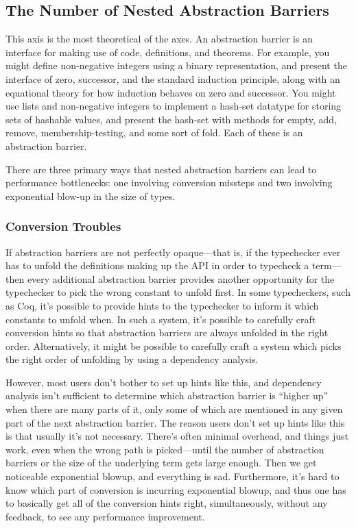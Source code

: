 
\subsection{The Number of Nested Abstraction Barriers}


This axis is the most theoretical of the axes.
An abstraction barrier is an interface for making use of code, definitions, and theorems.
For example, you might define non-negative integers using a binary representation, and present the interface of zero, successor, and the standard induction principle, along with an equational theory for how induction behaves on zero and successor.
You might use lists and non-negative integers to implement a hash-set datatype for storing sets of hashable values, and present the hash-set with methods for empty, add, remove, membership-testing, and some sort of fold.
Each of these is an abstraction barrier.

There are three primary ways that nested abstraction barriers can lead to performance bottlenecks: one involving conversion missteps and two involving exponential blow-up in the size of types.

\subsubsection{Conversion Troubles}
If abstraction barriers are not perfectly opaque---that is, if the typechecker ever has to unfold the definitions making up the API in order to typecheck a term---then every additional abstraction barrier provides another opportunity for the typechecker to pick the wrong constant to unfold first.
In some typecheckers, such as Coq, it's possible to provide hints to the typechecker to inform it which constants to unfold when.
In such a system, it's possible to carefully craft conversion hints so that abstraction barriers are always unfolded in the right order.
Alternatively, it might be possible to carefully craft a system which picks the right order of unfolding by using a dependency analysis.

However, most users don't bother to set up hints like this, and dependency analysis isn't sufficient to determine which abstraction barrier is ``higher up'' when there are many parts of it, only some of which are mentioned in any given part of the next abstraction barrier.
The reason users don't set up hints like this is that usually it's not necessary.
There's often minimal overhead, and things just work, even when the wrong path is picked---until the number of abstraction barriers or the size of the underlying term gets large enough.
Then we get noticeable exponential blowup, and everything is sad.
Furthermore, it's hard to know which part of conversion is incurring exponential blowup, and thus one has to basically get all of the conversion hints right, simultaneously, without any feedback, to see any performance improvement.



